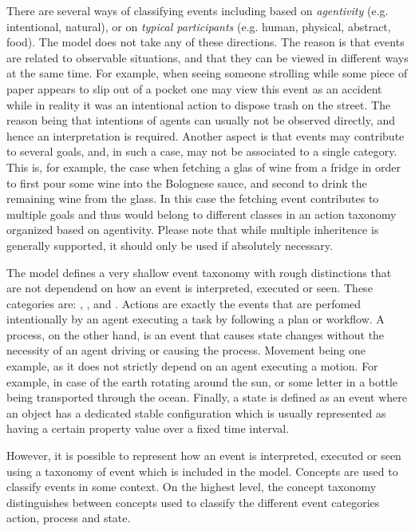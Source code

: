 There are several ways of classifying events including based on \emph{agentivity} (e.g. intentional, natural), or on \emph{typical participants} (e.g. human, physical, abstract, food).
The \neem model does not take any of these directions.
The reason is that events are related to observable situations, and that they can be viewed in different ways at the same time.
For example, when seeing someone strolling while some piece of paper appears to slip out of a pocket one may view this event as an accident while in reality it was an intentional action to dispose trash on the street.
The reason being that intentions of agents can usually not be observed directly, and hence an interpretation is required.
Another aspect is that events may contribute to several goals, and, in such a case, may not be associated to a single category.
This is, for example, the case when fetching a glas of wine from a fridge in order to first pour some wine into the Bolognese sauce, and second to drink the remaining wine from the glass.
In this case the fetching event contributes to multiple goals and thus would belong to different classes in an action taxonomy organized based on agentivity.
Please note that while multiple inheritence is generally supported, it should only be used if absolutely necessary. 

The \neem model defines a very shallow event taxonomy with rough distinctions that are not dependend on how an event is interpreted, executed or seen.
These categories are: , , and .
Actions are exactly the events that are perfomed intentionally by an agent executing a task by following a plan or workflow.
A process, on the other hand, is an event that causes state changes without the necessity of an agent driving or causing the process.
Movement being one example, as it does not strictly depend on an agent executing a motion.
For example, in case of the earth rotating around the sun, or some letter in a bottle being transported through the ocean.
Finally, a state is defined as an event where an object has a dedicated stable configuration which is usually represented as having a certain property value over a fixed time interval.

However, it is possible to represent how an event is interpreted, executed or seen using a taxonomy of event  which is included in the \neem model.
Concepts are used to classify events in some context.
On the highest level, the concept taxonomy distinguishes between concepts used to classify the different event categories action, process and state.

